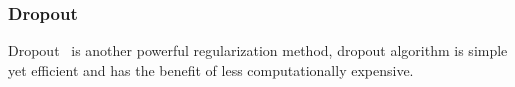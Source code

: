 \subsubsection{Dropout}

Dropout~\cite{JMLR:v15:srivastava14a} is another powerful regularization method, dropout algorithm is simple yet efficient and has the benefit of less computationally  expensive. 